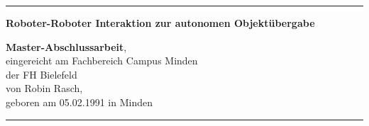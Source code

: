 \begin{titlepage}
\thispagestyle{empty}
    \hrule
    \vspace{1cm}
    \begin{center}
      
        {\huge\bf\sc Roboter-Roboter Interaktion zur autonomen Objektübergabe}
    \end{center}
    \vfill
    \begin{Large}
        {\bf Master-Abschlussarbeit},\\[48pt]
        eingereicht am Fachbereich Campus Minden\\
        der FH Bielefeld\\[72pt]
        von Robin Rasch,\\
        geboren am 05.02.1991 in Minden
        \vfill
        \noindent{\today}
    \end{Large}
    \vspace{1cm}
    \hrule
\end{titlepage}


